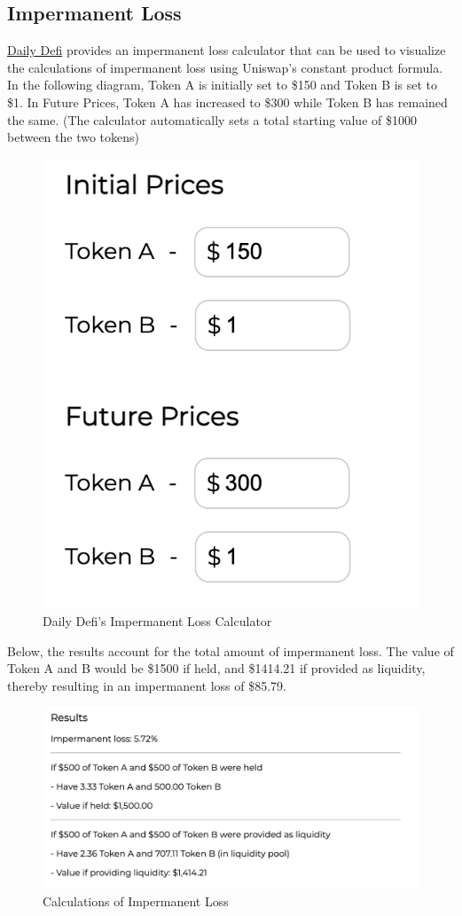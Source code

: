 \documentclass[12pt]{article}
\begin{document}
\subsection{Impermanent Loss}\label{subsec:impermanent}
\href{https://dailydefi.org/tools/impermanent-loss-calculator/}{Daily Defi} provides an impermanent loss calculator that can be used to visualize the calculations of impermanent loss using Uniswap's constant product formula.
In the following diagram, Token A is initially set to \$150 and Token B is set to \$1. In Future Prices, Token A has increased to \$300 while Token B has remained the same. (The calculator automatically sets a total starting value of \$1000 between the two tokens)
\begin{figure}[H]
    \centering
    \includegraphics[width=0.4\linewidth]{impermanent_loss.png}
    \caption{Daily Defi's Impermanent Loss Calculator}
    \label{fig:impermanent_loss}
\end{figure}

Below, the results account for the total amount of impermanent loss. The value of Token A and B would be \$1500 if held, and \$1414.21 if provided as liquidity, thereby resulting in an impermanent loss of \$85.79.

\begin{figure}[H]
    \centering
    \includegraphics[width=0.6\linewidth]{results.png}
    \caption{Calculations of Impermanent Loss}
    \label{fig:calculations}
\end{figure}
\end{document}
